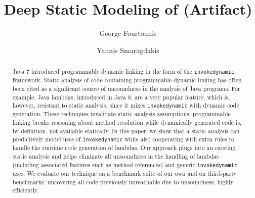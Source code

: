 \documentclass[a4paper,UKenglish]{darts-v2019}
\title{Deep Static Modeling of \invokedynamic{} (Artifact)} %
\author{George Fourtounis}{Department of Informatics, University of Athens, Greece \and \url{http://gfour.github.io/} }{gfour@di.uoa.gr}{https://orcid.org/0000-0002-2116-0797}{}%
\author{Yannis Smaragdakis}{Department of Informatics, University of Athens, Greece \and \url{http://yanniss.github.io/}}{smaragd@di.uoa.gr}{}{}
\newcommand{\invokedynamic}{\texttt{invokedynamic}}
\begin{document}
\maketitle

\begin{abstract}
  Java 7 introduced programmable dynamic linking in the form of the
  \invokedynamic{} framework. Static analysis of code containing
  programmable dynamic linking has often been cited as a significant
  source of unsoundness in the analysis of Java programs. For example,
  Java lambdas, introduced in Java 8, are a very popular feature,
  which is, however, resistant to static analysis, since it mixes
  \invokedynamic{} with dynamic code generation. These techniques
  invalidate static analysis assumptions: programmable linking breaks
  reasoning about method resolution while dynamically generated code
  is, by definition, not available statically. In this paper, we show
  that a static analysis can predictively model uses of
  \invokedynamic{} while also cooperating with extra rules to handle
  the runtime code generation of lambdas. Our approach plugs into an
  existing static analysis and helps eliminate all unsoundness in the
  handling of lambdas (including associated features such as method
  references) and generic \invokedynamic{} uses. We evaluate our
  technique on a benchmark suite of our own and on third-party
  benchmarks, uncovering all code previously unreachable due to
  unsoundness, highly efficiently.
 \end{abstract}

\end{document}
